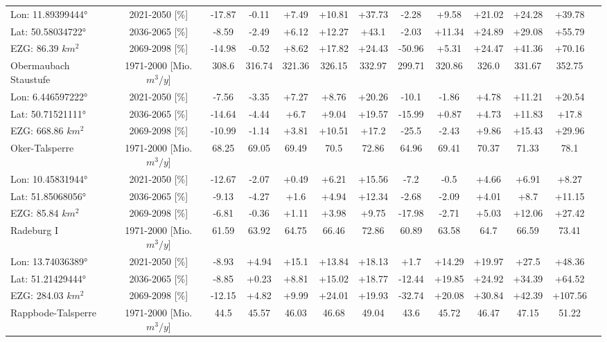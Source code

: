 \begin{longtable}{@{\extracolsep{\fill}}lc|ccccc||cccccc}
\cline{2-12} 
Lon: 11.89399444° & 2021-2050 [\%]  & -17.87 & -0.11 & +7.49 & +10.81 & +37.73 & -2.28 & +9.58 & +21.02 & +24.28 & +39.78\\ 
Lat: 50.58034722° & 2036-2065 [\%]  & -8.59 & -2.49 & +6.12 & +12.27 & +43.1 & -2.03 & +11.34 & +24.89 & +29.08 & +55.79\\ 
EZG: 86.39 $km^2$ & 2069-2098 [\%]  & -14.98 & -0.52 & +8.62 & +17.82 & +24.43 & -50.96 & +5.31 & +24.47 & +41.36 & +70.16\\ 
\hline 
Obermaubach Staustufe & 1971-2000 [Mio. $m^3/y$]  & 308.6 & 316.74 & 321.36 & 326.15 & 332.97 & 299.71 & 320.86 & 326.0 & 331.67 & 352.75\\ 
\cline{2-12} 
Lon: 6.446597222° & 2021-2050 [\%]  & -7.56 & -3.35 & +7.27 & +8.76 & +20.26 & -10.1 & -1.86 & +4.78 & +11.21 & +20.54\\ 
Lat: 50.71521111° & 2036-2065 [\%]  & -14.64 & -4.44 & +6.7 & +9.04 & +19.57 & -15.99 & +0.87 & +4.73 & +11.83 & +17.8\\ 
EZG: 668.86 $km^2$ & 2069-2098 [\%]  & -10.99 & -1.14 & +3.81 & +10.51 & +17.2 & -25.5 & -2.43 & +9.86 & +15.43 & +29.96\\ 
\hline 
Oker-Talsperre & 1971-2000 [Mio. $m^3/y$]  & 68.25 & 69.05 & 69.49 & 70.5 & 72.86 & 64.96 & 69.41 & 70.37 & 71.33 & 78.1\\ 
\cline{2-12} 
Lon: 10.45831944° & 2021-2050 [\%]  & -12.67 & -2.07 & +0.49 & +6.21 & +15.56 & -7.2 & -0.5 & +4.66 & +6.91 & +8.27\\ 
Lat: 51.85068056° & 2036-2065 [\%]  & -9.13 & -4.27 & +1.6 & +4.94 & +12.34 & -2.68 & -2.09 & +4.01 & +8.7 & +11.15\\ 
EZG: 85.84 $km^2$ & 2069-2098 [\%]  & -6.81 & -0.36 & +1.11 & +3.98 & +9.75 & -17.98 & -2.71 & +5.03 & +12.06 & +27.42\\ 
\hline 
Radeburg I & 1971-2000 [Mio. $m^3/y$]  & 61.59 & 63.92 & 64.75 & 66.46 & 72.86 & 60.89 & 63.58 & 64.7 & 66.59 & 73.41\\ 
\cline{2-12} 
Lon: 13.74036389° & 2021-2050 [\%]  & -8.93 & +4.94 & +15.1 & +13.84 & +18.13 & +1.7 & +14.29 & +19.97 & +27.5 & +48.36\\ 
Lat: 51.21429444° & 2036-2065 [\%]  & -8.85 & +0.23 & +8.81 & +15.02 & +18.77 & -12.44 & +19.85 & +24.92 & +34.39 & +64.52\\ 
EZG: 284.03 $km^2$ & 2069-2098 [\%]  & -12.15 & +4.82 & +9.99 & +24.01 & +19.93 & -32.74 & +20.08 & +30.84 & +42.39 & +107.56\\ 
\hline 
Rappbode-Talsperre & 1971-2000 [Mio. $m^3/y$]  & 44.5 & 45.57 & 46.03 & 46.68 & 49.04 & 43.6 & 45.72 & 46.47 & 47.15 & 51.22\\ 

\end{longtable}
